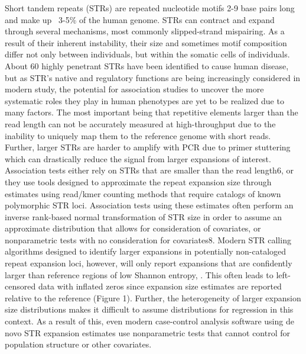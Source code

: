 \documentclass[unnumsec,webpdf,contemporary,large]{oup-authoring-template}%
\theoremstyle{thmstyleone}%
\theoremstyle{thmstyletwo}%
\theoremstyle{thmstylethree}%
\begin{document}
Short tandem repeats (STRs) are repeated nucleotide motifs 2-9 base pairs long and make up
 ~3-5\% of the human genome\cite{gymrek_genomic_2017}. STRs can contract and expand through
several mechanisms, most commonly slipped-strand mispairing. As a result of their inherent
instability, their size and sometimes motif composition differ not only between individuals, 
but within the somatic cells of individuals\cite{cortes-ciriano_molecular_2017}. About 60 highly
penetrant STRs have been identified to cause human disease\cite{paulson_repeat_2018}, but as
STR's native and regulatory functions are being increasingly considered in modern study\cite{wright_native_2023},
the potential for association studies to uncover the more systematic roles they play in human
phenotypes are yet to be realized due to many factors. The most important being that repetitive
elements larger than the read length can not be accurately measured at high-throughput due to the
inability to uniquely map them to the reference genome with short reads. Further, larger STRs 
are harder to amplify with PCR due to primer stuttering which can drastically reduce the signal
from larger expansions of interest.\cite{dashnow_strling_2022} Association tests either rely on
STRs that are smaller than the read length6, or they use tools designed to approximate the repeat
expansion size through estimates using read/kmer counting methods that require catalogs of known
polymorphic STR loci\cite{margoliash_polymorphic_nodate}. Association tests using these estimates
often perform an inverse rank-based normal transformation of STR size in order to assume an 
approximate distribution that allows for consideration of covariates, or nonparametric tests with
no consideration for covariates8. Modern STR calling algorithms designed to identify larger 
expansions in potentially non-cataloged repeat expansion loci, however, will only report
expansions that are confidently larger than reference regions of low Shannon entropy\cite{dashnow_strling_2022},
\cite{dolzhenko_expansionhunter_2020}. This often leads to left-censored data with inflated 
zeros since expansion size estimates are reported relative to the reference (Figure 1).
Further, the heterogeneity of larger expansion size distributions makes it difficult to
assume distributions for regression in this context. As a result of this, even modern 
case-control analysis software using de novo STR expansion estimates use nonparametric tests
that cannot control for population structure or other covariates\cite{dolzhenko_expansionhunter_2020}.
\end{document}
